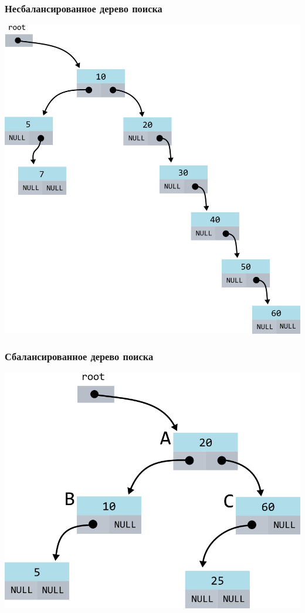 \documentclass[10pt,pdf,hyperref={unicode}]{beamer}
\begin{document}
\begin{frame}[fragile]
\frametitle{Несбалансированное дерево поиска}
\begin{center}
\includegraphics[scale=0.6]{images/tree/unbalanced_tree.png}
\end{center}
\end{frame}

\begin{frame}[fragile]
\frametitle{Сбалансированное дерево поиска}
\begin{center}
\includegraphics[scale=0.6]{images/tree/balanced_tree.png}
\end{center}
\end{frame}
\end{document}
